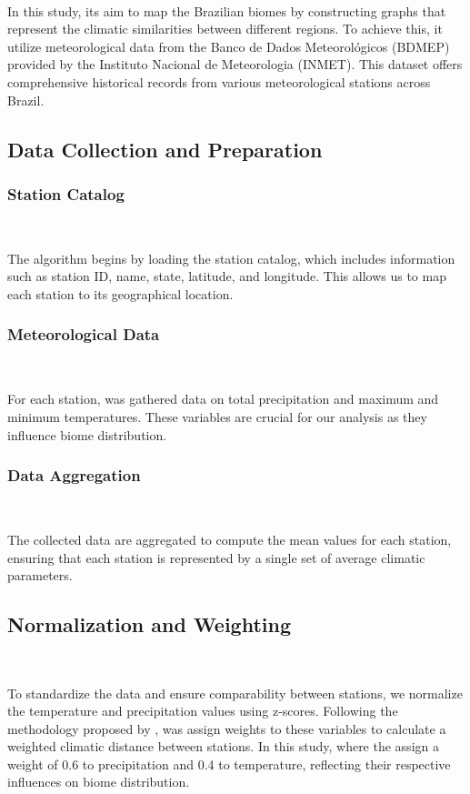\documentclass[conference]{IEEEtran}
\begin{document}
\

In this study, its aim to map the Brazilian biomes by constructing graphs that represent the climatic similarities between different regions. To achieve this, it utilize meteorological data from the Banco de Dados Meteorológicos (BDMEP) provided by the Instituto Nacional de Meteorologia (INMET). This dataset offers comprehensive historical records from various meteorological stations across Brazil.

\subsection{Data Collection and Preparation}

\subsubsection{Station Catalog}

\

 The algorithm begins by loading the station catalog, which includes information such as station ID, name, state, latitude, and longitude. This allows us to map each station to its geographical location.
\subsubsection{Meteorological Data}

\

For each station, was gathered data on total precipitation and maximum and minimum temperatures. These variables are crucial for our analysis as they influence biome distribution.

\subsubsection{Data Aggregation}

\

The collected data are aggregated to compute the mean values for each station, ensuring that each station is represented by a single set of average climatic parameters.

\subsection{Normalization and Weighting}

\

To standardize the data and ensure comparability between stations, we normalize the temperature and precipitation values using z-scores. Following the methodology proposed by \cite{whittaker1975communities}, was assign weights to these variables to calculate a weighted climatic distance between stations. In this study, where  the assign a weight of 0.6 to precipitation and 0.4 to temperature, reflecting their respective influences on biome distribution.
\end{document}
